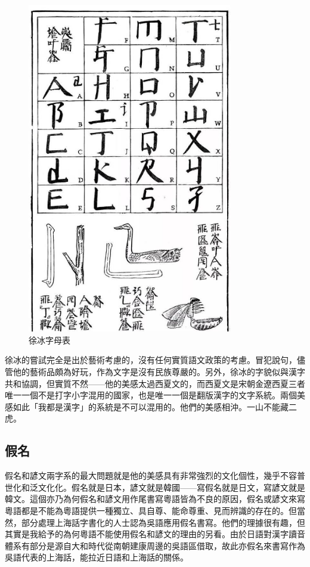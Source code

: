 \documentclass[a5paper, 12pt, openany]{book} %
\begin{document}
\begin{figure}[H]
  \centering
  \includegraphics[width=0.8\textwidth]{./images/xubing_3.png}
  \caption{徐冰字母表}
  \label{fig:xubing_3}
\end{figure}


徐冰的嘗試完全是出於藝術考慮的，沒有任何實質語文政策的考慮。冒犯說句，儘管他的藝術品頗為好玩，作為文字是沒有民族尊嚴的。另外，徐冰的字貌似與漢字共和協調，但實質不然——他的美感太過西夏文的，而西夏文是宋朝金遼西夏三者唯一一個不是打字小字混用的國家，也是唯一一個是翻版漢字的文字系統。兩個美感如此「我都是漢字」的系統是不可以混用的。他們的美感相沖。一山不能藏二虎。

\subsection{假名}

假名和諺文兩字系的最大問題就是他的美感具有非常強烈的文化個性，幾乎不容普世化和泛文化化。假名就是日本，諺文就是韓國——寫假名就是日文，寫諺文就是韓文。這個亦乃為何假名和諺文用作尾書寫粵語皆為不良的原因，假名或諺文來寫粵語都是不能為粵語提供一種獨立、具自尊、能命尊重、見而辨識的存在的。但當然，部分處理上海話字書化的人士認為吳語應用假名書寫。他們的理據很有趣，但其實是我給予的為何粵語不能使用假名和諺文的理由的另看。由於日語對漢字讀音體系有部分是源自大和時代從南朝建康周邊的吳語區借取，故此亦假名來書寫作為吳語代表的上海話，能拉近日語和上海話的關係。 
\end{document}
